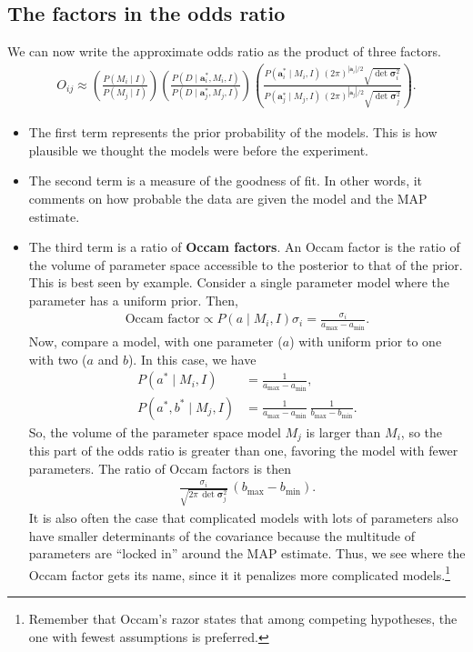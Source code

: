 \subsection{The factors in the odds ratio}
We can now write the approximate odds ratio as the product of three
factors.
\begin{align}
O_{ij} \approx \left(\frac{P(M_i\mid I)}{P(M_j\mid I)}\right)
\left(\frac{P(D\mid \mathbf{a}_i^*, M_i, I)}{P(D\mid \mathbf{a}_j^*, M_j, I)}\right)
\left(\frac{P(\mathbf{a}_i^*\mid M_i, I)\,\left(2\pi\right)^{|\mathbf{a}_i|/2}\sqrt{\det\boldsymbol{\sigma}_i^2}}
{P(\mathbf{a}_j^*\mid M_j, I)\,\left(2\pi\right)^{|\mathbf{a}_j|/2}\sqrt{\det\boldsymbol{\sigma}_j^2}}\right).
\end{align}
\begin{itemize}
\item The first term represents the prior probability of the models.  This is
  how plausible we thought the models were before the experiment.
\item The second term is a measure of the goodness of fit.  In other
  words, it comments on how probable the data are given the model and the
  MAP estimate.
\item The third term is a ratio of \textbf{Occam factors}.  An Occam
  factor is the ratio of the volume of parameter space accessible to
  the posterior to that of the prior.  This is best seen by example.
  Consider a single parameter model where the parameter has a uniform
  prior.  Then,
  \begin{align}
    \text{Occam factor} \propto P(a\mid M_i, I) \sigma_i = \frac{\sigma_i}{a_\mathrm{max} - a_\mathrm{min}}.
  \end{align}
  Now, compare a model, with one parameter ($a$) with uniform prior to
  one with two ($a$ and $b$).  In this case, we have
  \begin{align}
    P(a^*\mid M_i,I) &= \frac{1}{a_\mathrm{max} - a_\mathrm{min}}, \\
    P(a^*, b^*\mid M_j,I) &= \frac{1}{a_\mathrm{max} - a_\mathrm{min}}\,
                            \frac{1}{b_\mathrm{max} - b_\mathrm{min}}.
  \end{align}
  So, the volume of the parameter space model $M_j$ is larger than
  $M_i$, so the this part of the odds ratio is greater than one,
  favoring the model with fewer parameters.  The ratio of Occam
  factors is then
  \begin{align}
    \frac{\sigma_i}{\sqrt{2\pi \,\det \boldsymbol{\sigma}_j^2}}\, (b_\mathrm{max} - b_\mathrm{min}).
  \end{align}
  It is also often the case that complicated models with lots of
  parameters also have smaller determinants of the covariance because
  the multitude of parameters are ``locked in'' around the MAP
  estimate.  Thus, we see where the Occam factor gets its name, since
  it it penalizes more complicated models.\footnote{Remember that
    Occam's razor states that among competing hypotheses, the one with
    fewest assumptions is preferred.}
\end{itemize}

